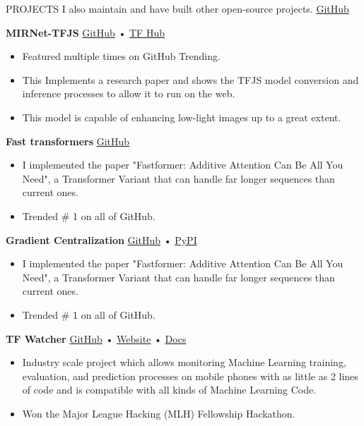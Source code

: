 \documentclass{resume} %
\begin{document}
\begin{rSection}{PROJECTS}
I also maintain and have built other open-source projects. \href{https://github.com/Rishit-dagli}{GitHub}

{\bf MIRNet-TFJS} \hfill {\href{https://github.com/Rishit-dagli/MIRNet-TFJS}{GitHub} • \href{https://tfhub.dev/rishit-dagli/mirnet-tfjs}{TF Hub}}
 \begin{itemize}
    \itemsep -3pt {} 
\item Featured multiple times on GitHub Trending.
\item This Implements a research paper and shows the TFJS model conversion and inference processes to allow it to run on the web.
\item This model is capable of enhancing low-light images up to a great extent.
\end{itemize}

{\bf Fast transformers} \hfill {\href{https://github.com/Rishit-dagli/Fast-Transformer}{GitHub}}
 \begin{itemize}
    \itemsep -3pt {} 
\item I implemented the paper "Fastformer: Additive Attention Can Be All You Need", a Transformer Variant that can handle far longer sequences than current ones.
\item Trended \# 1 on all of GitHub.
\end{itemize}

{\bf Gradient Centralization} \hfill {\href{https://github.com/RISHIT-DAGLI/GRADIENT-CENTRALIZATION-TENSORFLOW}{GitHub} • \href{https://pypi.org/project/gradient-centralization-tf/}{PyPI}}
 \begin{itemize}
    \itemsep -3pt {} 
\item I implemented the paper "Fastformer: Additive Attention Can Be All You Need", a Transformer Variant that can handle far longer sequences than current ones.
\item Trended \# 1 on all of GitHub.
\end{itemize}

{\bf TF Watcher} \hfill {\href{https://github.com/Rishit-dagli/TF-Watcher}{GitHub} • \href{https://www.tfwatcher.tech/}{Website} • \href{https://rishit-dagli.github.io/TF-Watcher/}{Docs}}
 \begin{itemize}
    \itemsep -3pt {} 
\item Industry scale project which allows monitoring Machine Learning training, evaluation, and prediction processes on mobile phones with as little as 2 lines of code and is compatible with all kinds of Machine Learning Code.
\item Won the Major League Hacking (MLH) Fellowship Hackathon.
\end{itemize}


\end{rSection}
\end{document}
